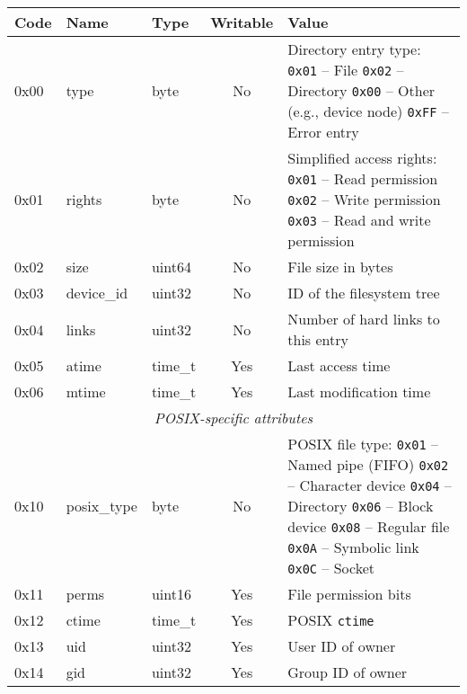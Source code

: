 \begin{table}[p]
\begin{center}

\def\tline#1#2#3{
{\ttfamily #1} & {\ttfamily #2} & {\ttfamily #3}
}
\begin{tabular}{lllcp{6cm}}
	\hline
	Code & Name & Type & Writable & Value \\
	\hline
	\tline{0x00}{type}{byte} & No &
		Directory entry type: \newline
		{\tt 0x01} -- File \newline
		{\tt 0x02} -- Directory \newline
		{\tt 0x00} -- Other (e.g., device node) \newline
		{\tt 0xFF} -- Error entry
		\\
	\tline{0x01}{rights}{byte} & No &
		Simplified access rights:\newline
		{\tt 0x01} -- Read permission \newline
		{\tt 0x02} -- Write permission \newline
		{\tt 0x03} -- Read and write permission
		\\
	\tline{0x02}{size}{uint64} & No & File size in bytes \\
	\tline{0x03}{device\_id}{uint32} & No & ID of the filesystem tree\footnotemark[1] \\
	\tline{0x04}{links}{uint32} & No & Number of hard links to this entry \\
	\tline{0x05}{atime}{time\_t} & Yes & Last access time \\
	\tline{0x06}{mtime}{time\_t} & Yes & Last modification time \\

	\hline
	\multicolumn{5}{c}{\textit{POSIX-specific attributes}} \\
	\hline

	\tline{0x10}{posix\_type}{byte} & No &
		POSIX file type:\footnotemark[2] \newline
		{\tt 0x01} -- Named pipe (FIFO) \newline
		{\tt 0x02} -- Character device \newline
		{\tt 0x04} -- Directory \newline
		{\tt 0x06} -- Block device \newline
		{\tt 0x08} -- Regular file \newline
		{\tt 0x0A} -- Symbolic link \newline
		{\tt 0x0C} -- Socket
		\\
	\tline{0x11}{perms}{uint16} & Yes & File permission bits\footnotemark[3] \\
	\tline{0x12}{ctime}{time\_t} & Yes & POSIX {\tt ctime} \\
	\tline{0x13}{uid}{uint32} & Yes & User ID of owner \\
	\tline{0x14}{gid}{uint32} & Yes & Group ID of owner \\


\end{tabular}
\end{center}
\end{table}
